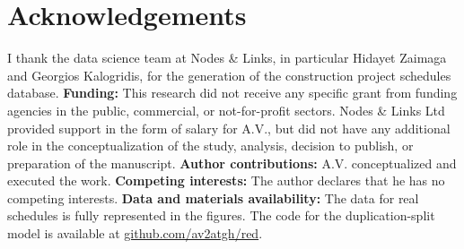 \documentclass[11pt]{article}
\begin{document}
\section*{Acknowledgements}

I thank the data science team at Nodes \& Links, in particular Hidayet Zaimaga and Georgios Kalogridis, for the generation of the construction project schedules database. 
%
{\bf Funding:} This research did not receive any specific grant from funding agencies in the public, commercial, or not-for-profit sectors. Nodes \& Links Ltd provided support in the form of salary for A.V., but did not have any additional role in the conceptualization of the study, analysis, decision to publish, or preparation of the manuscript.
%
{\bf Author contributions:} A.V. conceptualized and executed the work.
%
{\bf Competing interests:} The author declares that he has no competing interests.
%
{\bf Data and materials availability:} The data for real schedules is fully represented in the figures. The code for the duplication-split model is available at \href{https://github.com/av2atgh/red}{github.com/av2atgh/red}.






%
\end{document}
